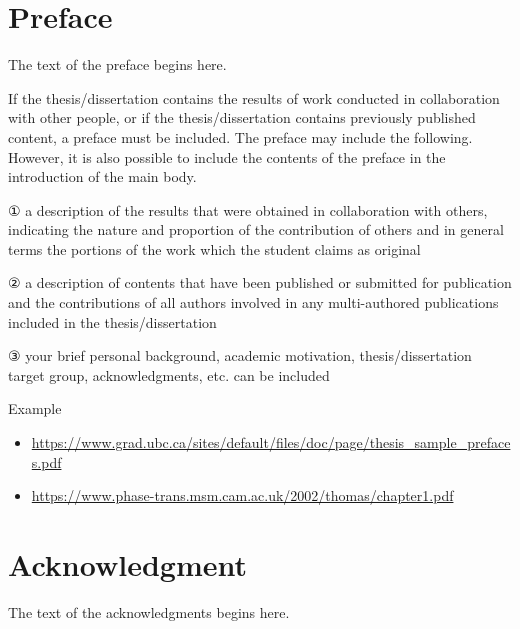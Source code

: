 \documentclass{report}
\begin{document}

\newpage
\chapter*{Preface}
\normalsize
The text of the preface begins here. 

If the thesis/dissertation contains the results of work conducted in collaboration with other people, or if the thesis/dissertation contains previously published content, a preface must be included. The preface may include the following. However, it is also possible to include the contents of the preface in the introduction of the main body.\par

① a description of the results that were obtained in collaboration with others, indicating the nature and proportion of the contribution of others and in general terms the portions of the work which the student claims as original \par
② a description of contents that have been published or submitted for publication and the contributions of all authors involved in any multi-authored publications included in the thesis/dissertation \par
③ your brief personal background, academic motivation, thesis/dissertation target group, acknowledgments, etc. can be included 

\bigskip
Example
\begin{itemize}
\item\url{https://www.grad.ubc.ca/sites/default/files/doc/page/thesis_sample_prefaces.pdf}
\item\url{https://www.phase-trans.msm.cam.ac.uk/2002/thomas/chapter1.pdf}
\end{itemize}




\newpage
\chapter*{Acknowledgment}

The text of the acknowledgments begins here.

\renewcommand*\contentsname{Table of Contents}
\tableofcontents
\end{document}
